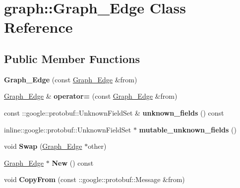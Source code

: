 \hypertarget{classgraph_1_1Graph__Edge}{
\section{graph::Graph\_\-Edge Class Reference}
\label{classgraph_1_1Graph__Edge}
}
\subsection*{Public Member Functions}
\begin{DoxyCompactItemize}
\item 
\hypertarget{classgraph_1_1Graph__Edge_a1b8cdd9aa0720a4b78149954fb109810}{
{\bfseries Graph\_\-Edge} (const \hyperlink{classgraph_1_1Graph__Edge}{Graph\_\-Edge} \&from)}
\label{classgraph_1_1Graph__Edge_a1b8cdd9aa0720a4b78149954fb109810}

\item 
\hypertarget{classgraph_1_1Graph__Edge_a271827f73c4c315e95210cccb000e8f1}{
\hyperlink{classgraph_1_1Graph__Edge}{Graph\_\-Edge} \& {\bfseries operator=} (const \hyperlink{classgraph_1_1Graph__Edge}{Graph\_\-Edge} \&from)}
\label{classgraph_1_1Graph__Edge_a271827f73c4c315e95210cccb000e8f1}

\item 
\hypertarget{classgraph_1_1Graph__Edge_ad3839379afb5e8a8965bbfa48e6ab52c}{
const ::google::protobuf::UnknownFieldSet \& {\bfseries unknown\_\-fields} () const }
\label{classgraph_1_1Graph__Edge_ad3839379afb5e8a8965bbfa48e6ab52c}

\item 
\hypertarget{classgraph_1_1Graph__Edge_ab23e809a21f594cc319a0d1f781fa384}{
inline::google::protobuf::UnknownFieldSet $\ast$ {\bfseries mutable\_\-unknown\_\-fields} ()}
\label{classgraph_1_1Graph__Edge_ab23e809a21f594cc319a0d1f781fa384}

\item 
\hypertarget{classgraph_1_1Graph__Edge_aaaf2710e8754faf829d2966551176aac}{
void {\bfseries Swap} (\hyperlink{classgraph_1_1Graph__Edge}{Graph\_\-Edge} $\ast$other)}
\label{classgraph_1_1Graph__Edge_aaaf2710e8754faf829d2966551176aac}

\item 
\hypertarget{classgraph_1_1Graph__Edge_a724cb0402b0736d438d0e99c04e83548}{
\hyperlink{classgraph_1_1Graph__Edge}{Graph\_\-Edge} $\ast$ {\bfseries New} () const }
\label{classgraph_1_1Graph__Edge_a724cb0402b0736d438d0e99c04e83548}

\item 
\hypertarget{classgraph_1_1Graph__Edge_ae610eaa471b68f5c8effe5bd28b5cf8c}{
void {\bfseries CopyFrom} (const ::google::protobuf::Message \&from)}
\label{classgraph_1_1Graph__Edge_ae610eaa471b68f5c8effe5bd28b5cf8c}


\end{DoxyCompactItemize}
